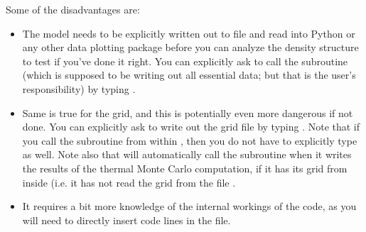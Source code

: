 \documentclass[letterpaper,10pt,english]{sphinxmanual}
\begin{document}
Some of the disadvantages are:
\begin{itemize}
\item {} 
The model needs to be explicitly written out to file and read into Python or
any other data plotting package before you can analyze the density structure
to test if you’ve done it right. You can explicitly ask  to call
the  subroutine (which is supposed to be writing out
all essential data; but that is the user’s responsibility) by typing
.

\item {} 
Same is true for the grid, and this is potentially even more dangerous if not
done. You can explicitly ask  to write out the grid file by
typing .  Note that if you call the
 subroutine from within , then
you do not have to explicitly type  as well.  Note
also that  will automatically call the 
subroutine when it writes the results of the thermal Monte Carlo computation,
if it has its grid from inside (i.e. it has not read the grid from the file
.

\item {} 
It requires a bit more knowledge of the internal workings of the 
code, as you will need to directly insert code lines in the
 file.

\end{itemize}
\end{document}
